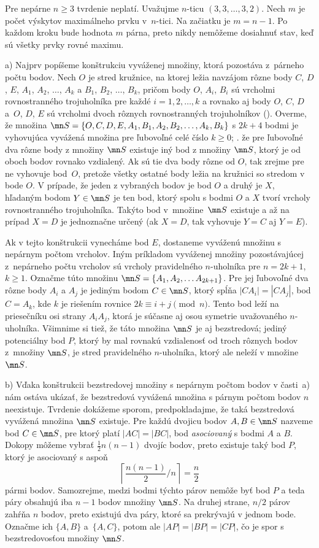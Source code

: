 {\poznamka
Pre nepárne $n\ge3$ tvrdenie neplatí. Uvažujme $n$-ticu $(3,3,\dots,3,2)$. Nech $m$ je počet výskytov maximálneho prvku v~$n$-tici. Na začiatku je $m=n-1$. Po každom kroku bude hodnota $m$ párna, preto nikdy nemôžeme dosiahnuť stav, keď sú všetky prvky rovné maximu.
}

{%
a)
Najprv popíšeme konštrukciu vyváženej množiny, ktorá pozostáva z~párneho počtu bodov. Nech $O$ je stred kružnice, na ktorej ležia navzájom rôzne body $C$, $D$, $E$, $A_1$, $A_2$, $\dots$, $A_k$ a $B_1$, $B_2$, $\dots$, $B_k$, pričom body $O$, $A_i$, $B_i$ sú vrcholmi rovnostranného trojuholníka pre každé $i=1,2,\dots,k$ a rovnako aj body $O$, $C$, $D$ a~$O$, $D$, $E$ sú vrcholmi dvoch rôznych rovnostranných trojuholníkov (\obr).
%
Overme, že množina ${\mn S}=\{O, C, D, E, A_1, B_1, A_2, B_2, \dots, A_k, B_k\}$ s $2k+4$ bodmi je vyhovujúca vyvážená množina pre ľubovoľné celé číslo $k\ge 0$; \tj. že pre ľubovoľné dva rôzne body z množiny $\mn S$ existuje iný bod z množiny $\mn S$, ktorý je od oboch bodov rovnako vzdialený. Ak sú tie dva body rôzne od $O$, tak zrejme pre ne vyhovuje bod~$O$, pretože všetky ostatné body ležia na kružnici so stredom v bode $O$. V prípade, že jeden z vybraných bodov je bod $O$ a druhý je $X$, hľadaným bodom $Y\in\mn S$ je ten bod, ktorý spolu s bodmi $O$ a $X$ tvorí vrcholy rovnostranného trojuholníka. Takýto bod v~množine~$\mn S$ existuje a až na prípad $X=D$ je jednoznačne určený (ak $X=D$, tak vyhovuje $Y=C$ aj $Y=E$).

Ak v tejto konštrukcii vynecháme bod $E$, dostaneme vyváženú množinu s nepárnym počtom vrcholov. Iným príkladom vyváženej množiny pozostávajúcej z~nepárneho počtu vrcholov sú vrcholy pravidelného $n$-uholníka pre $n=2k+1$, $k\ge 1$. Označme túto množinu ${\mn S}=\{A_1,A_2,\dots A_{2k+1}\}$. Pre jej ľubovoľné dva rôzne body $A_i$ a $A_j$ je jediným bodom $C\in\mn S$, ktorý spĺňa $|CA_i|=|CA_j|$, bod $C=A_k$, kde $k$ je riešením rovnice $2k\equiv i+j \pmod n$. Tento bod leží na priesečníku osi strany $A_iA_j$, ktorá je súčasne aj osou symetrie uvažovaného $n$-uholníka. Všimnime si tiež, že táto množina $\mn S$ je aj bezstredová; jediný potenciálny bod $P$, ktorý by mal rovnakú vzdialenosť od troch rôznych bodov z~množiny $\mn S$, je stred pravidelného $n$-uholníka, ktorý ale neleží v množine $\mn S$.

\smallskip
b)
Vďaka konštrukcii bezstredovej množiny s nepárnym počtom bodov v časti~a) nám ostáva ukázať, že bezstredová vyvážená množina s párnym počtom bodov $n$ neexistuje. Tvrdenie dokážeme sporom, predpokladajme, že taká bezstredová vyvážená množina $\mn S$ existuje. Pre každú dvojicu bodov $A, B\in\mn S$ nazveme bod $C\in\mn S$, pre ktorý platí $|AC|=|BC|$, bod {\it asociovaný} s bodmi $A$ a $B$. Dokopy môžeme vybrať $\frac12{n(n-1)}$ dvojíc bodov, preto existuje taký bod $P$, ktorý je asociovaný s aspoň
$$
\left\lceil\frac{n(n-1)}2/n\right\rceil=\frac n2
$$
pármi bodov. Samozrejme, medzi bodmi týchto párov nemôže byť bod $P$ a teda páry obsahujú iba $n-1$ bodov množiny $\mn S$. Na druhej strane, $n/2$ párov zahŕňa $n$ bodov, preto existujú dva páry, ktoré sa prekrývajú v jednom bode. Označme ich $\{A,B\}$ a~$\{A,C\}$, potom ale $|AP|=|BP|=|CP|$, čo je spor s bezstredovosťou množiny $\mn S$.
}

